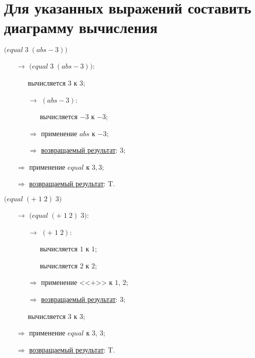 
\section{Для указанных выражений составить диаграмму вычисления}

\vfill
\problem $\bigl(equal\; 3\; (abs -\!3)\bigr)$

\begin{itemize}
	\item[$\longrightarrow$]$\bigl(equal\; 3\; (abs -\!3)\bigr)$:
	\begin{itemize}
		\item[\textbullet] вычисляется $3$ к $3$;
		\item[$\longrightarrow$] $(abs -\!3)$:
		\begin{itemize}
			\item[\textbullet] вычисляется $-3$ к $-3$;
		\end{itemize}
		\item[$\Longrightarrow$] применение $abs$ к $-3$;
		\item[$\Longrightarrow$] \underline{возвращаемый результат}: $3$;
	\end{itemize}
	\item[$\Longrightarrow$] применение $equal$ к $3, 3$;
	\item[$\Longrightarrow$] \underline{возвращаемый результат}: T.
\end{itemize}
\vfill


\problem $\bigl(equal\; (+\; 1\; 2)\; 3\bigr)$

\begin{itemize}
	\item[$\longrightarrow$] $\bigl(equal\; (+\; 1\; 2)\; 3\bigr)$:
	\begin{itemize}
		\item[$\longrightarrow$] $(+\; 1\; 2)$:
		\begin{itemize}
			\item[\textbullet] вычисляется $1$ к $1$;
			\item[\textbullet] вычисляется $2$ к $2$;
		\end{itemize}
		\item[$\Longrightarrow$] применение <<$+$>> к $1$, $2$;
		\item[$\Longrightarrow$] \underline{возвращаемый результат}: $3$;
		\item[\textbullet] вычисляется $3$ к $3$;
	\end{itemize}
	\item[$\Longrightarrow$] применение $equal$ к $3$, $3$;
	\item[$\Longrightarrow$] \underline{возвращаемый результат}: T.
\end{itemize}
\vfill



